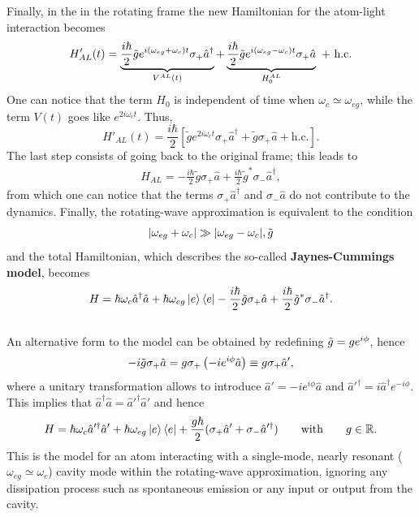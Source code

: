Finally, in the in the rotating frame the new Hamiltonian for the atom-light interaction becomes
\begin{equation*}
    H'_{AL}(t) = \underbrace{\frac{i \hbar}{2} \Tilde{g} {e^{i (\omega_{eg} + \omega_c) t}} \sigma_{+} \hat{a}^{\dagger}}_{V^{AL}(t)} + \underbrace{\frac{i \hbar}{2} \Tilde{g} 
    e^{i (\omega_{eg} - \omega_c  )t} \sigma_{+} \hat{a} }_{H^{AL}_0} ~+~ \text{h.c.} 
\end{equation*}
One can notice that the term $H_0$ is independent of time when $\omega_c \simeq \omega_{eg}$, while the term $V(t)$ goes like $e^{2 i \omega_c t}$. Thus, 
\begin{equation*}
    H'_{AL}(t) = \frac{i \hbar}{2} \left[ \tilde{g} e^{2 i \omega_c t} \sigma_+ \hat{a}^\dagger + \tilde{g} \sigma_{+} \hat{a} + \text{h.c.} \right].  
\end{equation*}
The last step consists of going back to the original frame; this leads to 
\begin{align*}
    H_{AL} = -\frac{i \hbar}{2} \tilde{g} \sigma_+ \hat{a} + \frac{i \hbar}{2} \tilde{g}^* \sigma_- \hat{a}^\dagger, 
\end{align*}
from which one can notice that the terms $\sigma_+ \hat{a}^\dagger$ and $\sigma_- \hat{a}$ do not contribute to the dynamics. 
Finally, the rotating-wave approximation is equivalent to the condition
\begin{align*}
    \abs{\omega_{eg} + \omega_c} \gg \abs{\omega_{eg} - \omega_c}, \tilde{g}
\end{align*}
and the total Hamiltonian, which describes the so-called \textbf{Jaynes-Cummings model}, becomes
\begin{align}
    H = \hbar \omega_c \hat{a}^\dagger \hat{a} + \hbar \omega_{eg} \ket{e}\bra{e} -\frac{i \hbar}{2} \tilde{g} \sigma_+ \hat{a} + \frac{i \hbar}{2} \tilde{g}^* \sigma_- \hat{a}^\dagger. 
\end{align}
\\

An alternative form to the model can be obtained by redefining $\Tilde{g} = g e^{i \phi}$, hence
\begin{equation*}
    -i \Tilde{g} \sigma_{+} \hat{a} = g \sigma_{+} \left(-i e^{i\phi} \hat{a} \right) \equiv {g} \sigma_+ \hat{a}',
\end{equation*}
where a unitary transformation allows to introduce $\hat{a}' = -i e^{i\phi} \hat{a}$ and $\hat{a}'^\dagger = i\hat{a}^\dagger e^{-i \phi}$. This implies that $\hat{a}^\dagger \hat{a} = \hat{a}'^\dagger \hat{a}'$ and hence 
\begin{equation} \label{eq:JCModel}
    H = \hbar \omega_c \hat{a}'^\dagger \hat{a}' + \hbar \omega_{eg} \ket{e}\bra{e} + \frac{g \hbar}{2} ( \sigma_+ \hat{a}' + \sigma_- \hat{a}'^\dagger) \qquad \text{with} \qquad g \in \mathbb{R}. 
\end{equation}
This is the model for an atom interacting with a single-mode, nearly resonant ($\omega_{eg} \simeq \omega_{c}$) cavity mode within the rotating-wave approximation, ignoring any dissipation process such as spontaneous emission or any input or output from the cavity.

